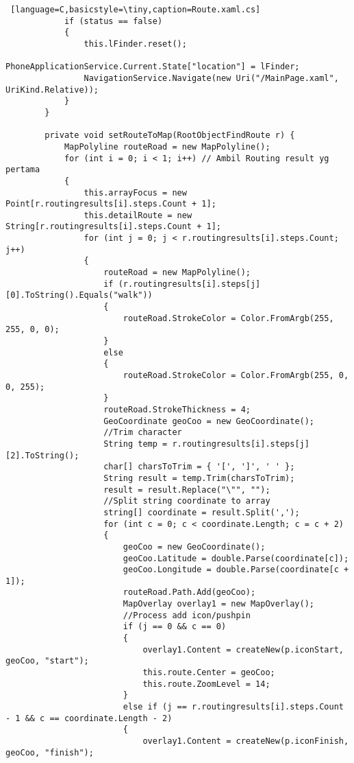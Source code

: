 \begin{lstlisting} [language=C,basicstyle=\tiny,caption=Route.xaml.cs]
            if (status == false)
            {
                this.lFinder.reset();
								PhoneApplicationService.Current.State["location"] = lFinder;
                NavigationService.Navigate(new Uri("/MainPage.xaml", UriKind.Relative));
            }
        }

        private void setRouteToMap(RootObjectFindRoute r) {
            MapPolyline routeRoad = new MapPolyline();
            for (int i = 0; i < 1; i++) // Ambil Routing result yg pertama
            {
                this.arrayFocus = new Point[r.routingresults[i].steps.Count + 1];
                this.detailRoute = new String[r.routingresults[i].steps.Count + 1];
                for (int j = 0; j < r.routingresults[i].steps.Count; j++)
                {
                    routeRoad = new MapPolyline();
                    if (r.routingresults[i].steps[j][0].ToString().Equals("walk"))
                    {
                        routeRoad.StrokeColor = Color.FromArgb(255, 255, 0, 0);
                    }
                    else
                    {
                        routeRoad.StrokeColor = Color.FromArgb(255, 0, 0, 255);
                    }
                    routeRoad.StrokeThickness = 4;
                    GeoCoordinate geoCoo = new GeoCoordinate();
                    //Trim character
                    String temp = r.routingresults[i].steps[j][2].ToString();
                    char[] charsToTrim = { '[', ']', ' ' };
                    String result = temp.Trim(charsToTrim);
                    result = result.Replace("\"", "");
                    //Split string coordinate to array
                    string[] coordinate = result.Split(',');
                    for (int c = 0; c < coordinate.Length; c = c + 2)
                    {
                        geoCoo = new GeoCoordinate();
                        geoCoo.Latitude = double.Parse(coordinate[c]);
                        geoCoo.Longitude = double.Parse(coordinate[c + 1]);
                        routeRoad.Path.Add(geoCoo);
                        MapOverlay overlay1 = new MapOverlay();
                        //Process add icon/pushpin
                        if (j == 0 && c == 0)
                        {
                            overlay1.Content = createNew(p.iconStart, geoCoo, "start");
                            this.route.Center = geoCoo;
                            this.route.ZoomLevel = 14;
                        }
                        else if (j == r.routingresults[i].steps.Count - 1 && c == coordinate.Length - 2)
                        {
                            overlay1.Content = createNew(p.iconFinish, geoCoo, "finish");

\end{lstlisting}
